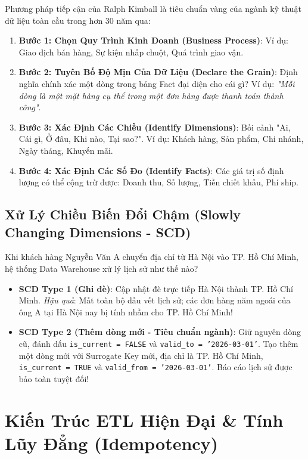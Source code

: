 Phương pháp tiếp cận của Ralph Kimball là tiêu chuẩn vàng của ngành kỹ thuật dữ liệu toàn cầu trong hơn 30 năm qua:

\begin{lythuyetbox}
\begin{enumerate}
    \item \textbf{Bước 1: Chọn Quy Trình Kinh Doanh (Business Process)}: Ví dụ: Giao dịch bán hàng, Sự kiện nhấp chuột, Quá trình giao vận.
    \item \textbf{Bước 2: Tuyên Bố Độ Mịn Của Dữ Liệu (Declare the Grain)}: Định nghĩa chính xác một dòng trong bảng Fact đại diện cho cái gì? Ví dụ: \textit{"Mỗi dòng là một mặt hàng cụ thể trong một đơn hàng được thanh toán thành công"}.
    \item \textbf{Bước 3: Xác Định Các Chiều (Identify Dimensions)}: Bối cảnh "Ai, Cái gì, Ở đâu, Khi nào, Tại sao?". Ví dụ: Khách hàng, Sản phẩm, Chi nhánh, Ngày tháng, Khuyến mãi.
    \item \textbf{Bước 4: Xác Định Các Số Đo (Identify Facts)}: Các giá trị số định lượng có thể cộng trừ được: Doanh thu, Số lượng, Tiền chiết khấu, Phí ship.
\end{enumerate}
\end{lythuyetbox}

\subsection{Xử Lý Chiều Biến Đổi Chậm (Slowly Changing Dimensions - SCD)}

Khi khách hàng Nguyễn Văn A chuyển địa chỉ từ Hà Nội vào TP. Hồ Chí Minh, hệ thống Data Warehouse xử lý lịch sử như thế nào?
\begin{itemize}
    \item \textbf{SCD Type 1 (Ghi đè)}: Cập nhật đè trực tiếp Hà Nội thành TP. Hồ Chí Minh. \textit{Hậu quả}: Mất toàn bộ dấu vết lịch sử; các đơn hàng năm ngoái của ông A tại Hà Nội nay bị tính nhầm cho TP. Hồ Chí Minh!
    \item \textbf{SCD Type 2 (Thêm dòng mới - Tiêu chuẩn ngành)}: Giữ nguyên dòng cũ, đánh dấu \texttt{is\_current = FALSE} và \texttt{valid\_to = '2026-03-01'}. Tạo thêm một dòng mới với Surrogate Key mới, địa chỉ là TP. Hồ Chí Minh, \texttt{is\_current = TRUE} và \texttt{valid\_from = '2026-03-01'}. Báo cáo lịch sử được bảo toàn tuyệt đối!
\end{itemize}

\section{Kiến Trúc ETL Hiện Đại \& Tính Lũy Đẳng (Idempotency)}

